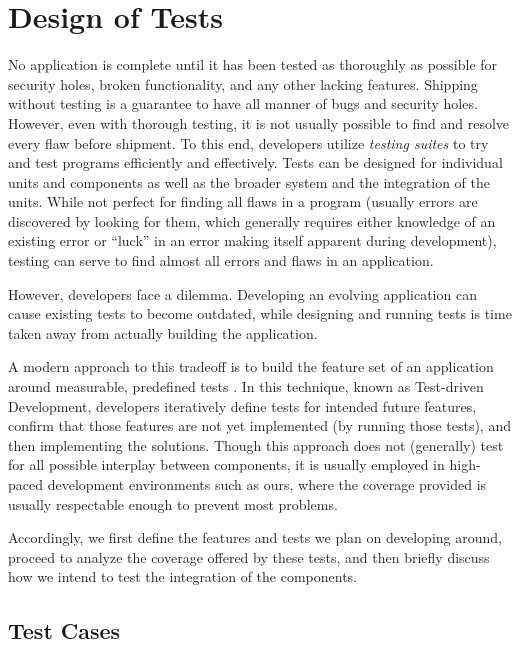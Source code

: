 \chapter{Design of Tests}

No application is complete until it has been tested
as thoroughly as possible for security holes, broken
functionality, and any other lacking features.
Shipping without testing is a guarantee to have
all manner of bugs and security holes. However, even
with thorough testing, it is not usually possible to
find and resolve every flaw before shipment. To this end,
developers utilize \emph{testing suites} to try and
test programs efficiently and effectively. Tests can be
designed for individual units and components as well as
the broader system and the integration of the units.
While not perfect for finding all flaws in a program
(usually errors are discovered by looking
for them, which generally requires either knowledge of an
existing error or ``luck'' in an error making itself
apparent during development), testing can serve to find
almost all errors and flaws in an application.

However, developers face a dilemma. Developing an
evolving application can cause existing tests to
become outdated, while designing and running tests
is time taken away from actually building the application.

A modern approach to this tradeoff is to build the
feature set of an application around measurable,
predefined tests \cite{wiki:tdd}. In this technique,
known as Test-driven Development, developers iteratively
define tests for intended future features, confirm that those
features are not yet implemented (by running those tests),
and then implementing the solutions. Though this approach
does not (generally) test for all possible interplay
between components, it is usually employed in high-paced
development environments such as ours, where the coverage provided is
usually respectable enough to prevent most problems.

Accordingly, we first define the features and tests we
plan on developing around, proceed to analyze the coverage
offered by these tests, and then briefly discuss how we
intend to test the integration of the components.

\section{Test Cases}

